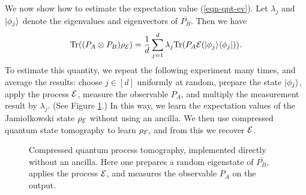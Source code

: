 
We now show how to estimate the expectation value (\ref{eqn-qpt-ev}).  Let $\lambda_j$ and $|{\phi_j}\rangle$ denote the eigenvalues and eigenvectors of $\overline{P_B}$.  Then we have 
\begin{equation*}
\mathrm{Tr}((P_A\otimes P_B) \rho_{\mathcal{E}})
 = \frac{1}{d} \sum_{j=1}^{d} \lambda_j \mathrm{Tr}(P_A \mathcal{E}(|{\phi_j}\rangle\langle{\phi_j}|)).
\end{equation*}
To estimate this quantity, we repeat the following experiment many times, and average the results:  choose $j\in [d]$ uniformly at random, prepare the state $|{\phi_j}\rangle$, apply the process $\mathcal{E}$, measure the observable $P_A$, and multiply the measurement result by $\lambda_j$.  (See Figure \ref{fig-qptdirect}.)  In this way, we learn the expectation values of the Jamio\l{}kowski state $\rho_{\mathcal{E}}$ without using an ancilla.  We then use compressed quantum state tomography to learn $\rho_{\mathcal{E}}$, and from this we recover $\mathcal{E}$.

\begin{figure}

\caption{\label{fig-qptdirect}Compressed quantum process tomography, implemented directly without an ancilla.  Here one prepares a random eigenstate of $\overline{P_B}$, applies the process $\mathcal{E}$, and measures the observable $P_A$ on the output.}
\end{figure}


